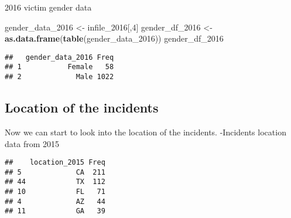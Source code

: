 \documentclass[
]{article}
\newenvironment{Shaded}{\begin{snugshade}}{\end{snugshade}}
\newcommand{\DecValTok}[1]{\textcolor[rgb]{0.00,0.00,0.81}{#1}}
\newcommand{\KeywordTok}[1]{\textcolor[rgb]{0.13,0.29,0.53}{\textbf{#1}}}
\newcommand{\NormalTok}[1]{#1}
\newcommand{\OperatorTok}[1]{\textcolor[rgb]{0.81,0.36,0.00}{\textbf{#1}}}
\newcommand{\StringTok}[1]{\textcolor[rgb]{0.31,0.60,0.02}{#1}}
\begin{document}
2016 victim gender data

\begin{Shaded}
\begin{Highlighting}[]
\NormalTok{gender_data_}\DecValTok{2016}\NormalTok{ <-}\StringTok{ }\NormalTok{infile_}\DecValTok{2016}\NormalTok{[,}\DecValTok{4}\NormalTok{]}
\NormalTok{gender_df_}\DecValTok{2016}\NormalTok{ <-}\StringTok{ }\KeywordTok{as.data.frame}\NormalTok{(}\KeywordTok{table}\NormalTok{(gender_data_}\DecValTok{2016}\NormalTok{))}
\NormalTok{gender_df_}\DecValTok{2016}
\end{Highlighting}
\end{Shaded}

\begin{verbatim}
##   gender_data_2016 Freq
## 1           Female   58
## 2             Male 1022
\end{verbatim}

\hypertarget{location-of-the-incidents}{%
\subsection{Location of the incidents}\label{location-of-the-incidents}}

Now we can start to look into the location of the incidents. -Incidents
location data from 2015

\begin{Shaded}
\end{Shaded}

\begin{verbatim}
##    location_2015 Freq
## 5             CA  211
## 44            TX  112
## 10            FL   71
## 4             AZ   44
## 11            GA   39
\end{verbatim}
\end{document}
